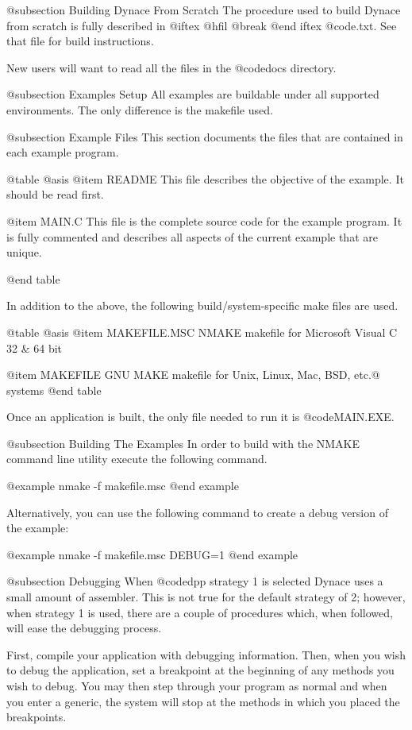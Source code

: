 @subsection Building Dynace From Scratch
The procedure used to build Dynace from scratch is fully described
in 
@iftex
@hfil @break 
@end iftex
@code{\DYNACE\DOCS\BUILD.txt}.  See that file for build instructions.

New users will want to read all the files in the @code{docs} directory.


@subsection Examples Setup
All examples are buildable under all supported environments.  The only
difference is the makefile used.



@subsection Example Files
This section documents the files that are contained in each example
program.

@table @asis
@item README
This file describes the objective of the example.  It should be read
first.

@item MAIN.C
This file is the complete source code for the example program.  It is
fully commented and describes all aspects of the current example that
are unique.

@end table


In addition to the above, the following build/system-specific make 
files are used.

@table @asis
@item MAKEFILE.MSC
NMAKE makefile for Microsoft Visual C 32 & 64 bit

@item MAKEFILE
GNU MAKE makefile for Unix, Linux, Mac, BSD, etc.@ systems
@end table

Once an application is built, the only file needed to run it is
@code{MAIN.EXE}.



@subsection Building The Examples
In order to build with the NMAKE command line utility execute the
following command.

@example
nmake -f makefile.msc
@end example

Alternatively, you can use the following command to create a debug
version of the example:

@example
nmake -f makefile.msc  DEBUG=1
@end example



@subsection Debugging
When @code{dpp} strategy 1 is selected Dynace uses a small amount of
assembler.  This is not true for the default strategy of 2; however,
when strategy 1 is used, there are a couple of procedures which, when
followed, will ease the debugging process.

First, compile your application with debugging information.  Then, when you
wish to debug the application, set a breakpoint at the beginning of any
methods you wish to debug.  You may then step through your program as
normal and when you enter a generic, the system will stop at the
methods in which you placed the breakpoints.


